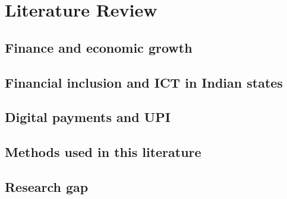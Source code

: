 \chapter{Literature Review}
\nocite{pradhan2021tfsc,pradhan2021ael,reddy2024icrier,singh2021eap,dumitrescu2012,lopez2017,love2006,abrigo2016}%

\section{Finance and economic growth}

\section{Financial inclusion and ICT in Indian states}

\section{Digital payments and UPI}

\section{Methods used in this literature}

\section{Research gap}
